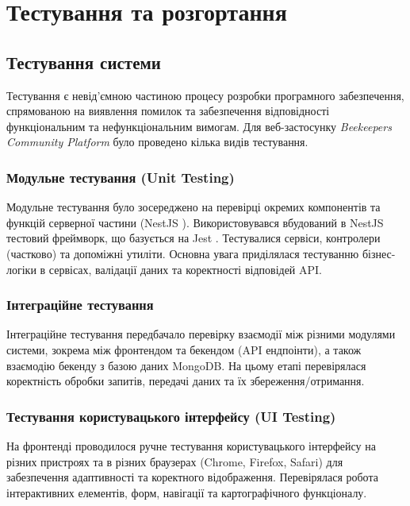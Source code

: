 \chapter{Тестування та розгортання}
\label{ch:testing_deployment}

\section{Тестування системи}
\label{sec:testing}
Тестування є невід'ємною частиною процесу розробки програмного забезпечення, спрямованою на виявлення помилок та забезпечення відповідності функціональним та нефункціональним вимогам. Для веб-застосунку \textit{Beekeepers Community Platform} було проведено кілька видів тестування.

\subsection{Модульне тестування (Unit Testing)}
Модульне тестування було зосереджено на перевірці окремих компонентів та функцій серверної частини (NestJS \cite{nestjs}). Використовувався вбудований в NestJS тестовий фреймворк, що базується на Jest \cite{jestjs}. Тестувалися сервіси, контролери (частково) та допоміжні утиліти. Основна увага приділялася тестуванню бізнес-логіки в сервісах, валідації даних та коректності відповідей API.

\subsection{Інтеграційне тестування}
Інтеграційне тестування передбачало перевірку взаємодії між різними модулями системи, зокрема між фронтендом та бекендом (API ендпоінти), а також взаємодію бекенду з базою даних MongoDB. На цьому етапі перевірялася коректність обробки запитів, передачі даних та їх збереження/отримання.

\subsection{Тестування користувацького інтерфейсу (UI Testing)}
На фронтенді проводилося ручне тестування користувацького інтерфейсу на різних пристроях та в різних браузерах (Chrome, Firefox, Safari) для забезпечення адаптивності та коректного відображення. Перевірялася робота інтерактивних елементів, форм, навігації та картографічного функціоналу.

